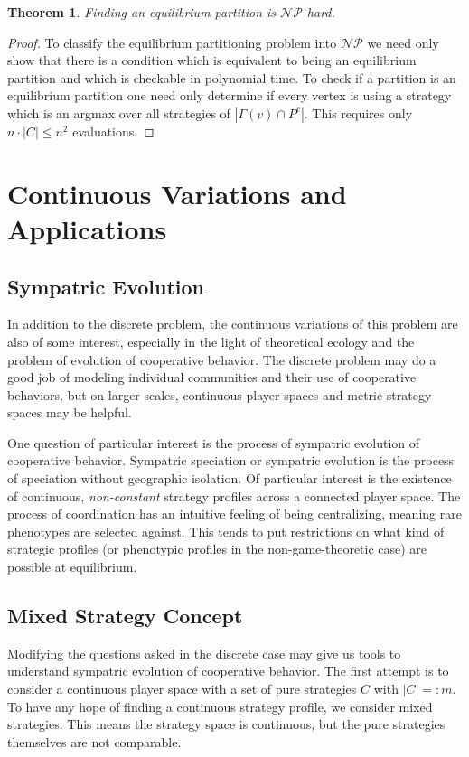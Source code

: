\documentclass[]{article}
\newtheorem{theorem}{Theorem}
\begin{document}
		\begin{theorem} Finding an equilibrium partition is $\mathcal{NP}$-hard.
		\end{theorem}
		\begin{proof}
				To classify the equilibrium partitioning problem into $\mathcal{NP}$ we need only show that there is a condition which is equivalent to being an equilibrium partition and which is checkable in polynomial time\cite{Sipser2006}. To check if a partition is an equilibrium partition one need only determine if every vertex is using a strategy which is an argmax over all strategies of $|\Gamma(v)\cap P^c|$. This requires only $n\cdot |C|\leq n^2$ evaluations.  
		\end{proof}


	\section{Continuous Variations and Applications}\label{continuousvariations}
	\subsection{Sympatric Evolution} \label{sympatricevoluiton}
		In addition to the discrete problem, the continuous variations of this problem are also of some interest, especially in the light of theoretical ecology and the problem of evolution of cooperative behavior.
		The discrete problem may do a good job of modeling individual communities and their use of cooperative behaviors, but on larger scales, continuous player spaces and metric strategy spaces may be helpful. 
		
		One question of particular interest is the process of sympatric evolution of cooperative behavior. Sympatric speciation or sympatric evolution is the process of speciation without geographic isolation. Of particular interest is the existence of continuous, \textit{non-constant} strategy profiles across a connected player space. The process of coordination has an intuitive feeling of being centralizing, meaning rare phenotypes are selected against. This tends to put restrictions on what kind of strategic profiles (or phenotypic profiles in the non-game-theoretic case) are possible at equilibrium.  
		\subsection{Mixed Strategy Concept}\label{mixedstrategyconcept}
		Modifying the questions asked in the discrete case may give us tools to understand sympatric evolution of cooperative behavior. The first attempt is to consider a continuous player space with a set of pure strategies $C$ with $|C|=:m$. To have any hope of finding a continuous strategy profile, we consider mixed strategies. This means the strategy space is continuous, but the pure strategies themselves are not comparable. 
\end{document}
